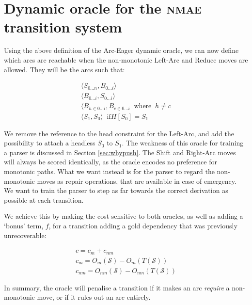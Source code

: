 \documentclass[11pt,letterpaper]{article}
\newcommand{\state}{\mathcal{S}}
\begin{document}
\section{Dynamic oracle for the \textsc{nmae} transition system}

Using the above definition of the Arc-Eager dynamic oracle, we can now
define which arcs are reachable when the non-monotonic Left-Arc and Reduce moves
are allowed. They will be the arcs such that:

\begin{eqnarray}
    \langle S_{0...n}, B_{0...i}\rangle \label{eqn:nmo1} \\
    \langle B_{0...i}, S_{0...i} \rangle \label{eqn:nmo2} \\
    \langle B_{h \in {0...i}}, B_{c \in {0...i}}\;\; \mbox{where}\;\; h \neq c\\
    \langle S_1, S_0 \rangle \;\; \mbox{if} H[S_0] = S_1
\end{eqnarray}

We remove the reference to the head constraint for the Left-Arc, and add the
possibility to attach a headless $S_0$ to $S_1$. The weakness of this oracle
for training a parser is discussed in Section \ref{sec:whypush}. The Shift and
Right-Arc moves will always be scored identically, as the oracle encodes no
preference for monotonic paths. What we want instead is for the parser to regard
the non-monotonic moves as repair operations, that are available in case of
emergency. We want to train the parser to step as far towards the correct derivation
as possible at each transition.

We achieve this by making the cost sensitive to both oracles, as well as adding a
`bonus' term, $f$, for a transition adding a gold dependency that was previously
unrecoverable:

\begin{eqnarray}
c = c_m + c_{nm}\\
c_m = O_m(\state) - O_m(T(\state))\\
c_{nm} = O_{nm}(\state) - O_{nm}(T(\state))
\end{eqnarray}

In summary, the oracle will penalise a transition if it makes an arc \emph{require}
a non-monotonic move, or if it rules out an arc entirely.
\end{document}
